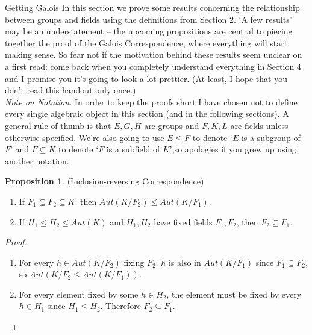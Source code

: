 \documentclass[12pt]{article}
\theoremstyle{definition}
\theoremstyle{definition}
\theoremstyle{definition}
\theoremstyle{definition}
\theoremstyle{definition}
\theoremstyle{definition}
\newtheorem{proposition}{Proposition}[section]
\theoremstyle{definition}
\begin{document}
\newpage

\begin{section}{Getting Galois}
    In this section we prove some results concerning the relationship between groups and fields using the definitions from Section 2. `A few results' may be an understatement -- the upcoming propositions 
    are central to piecing together the proof of the Galois Correspondence, where everything will start making sense. So fear not if the motivation behind these results seem unclear on a first read: 
    come back when you completely understand everything in Section 4 and I promise you it's going to look a lot prettier. (At least, I hope that you don't read this handout only once.)\\

    \textit{Note on Notation.} In order to keep the proofs short I have chosen not to define every single algebraic object in this section (and in the following sections). A general rule of thumb 
    is that \(E,G,H\) are groups and \(F,K,L\) are fields unless otherwise specified. We're also going to use \(E \leq F\) to denote `\(E\) is a subgroup of \(F\)' and \(F\subseteq K\) to denote 
    `\(F\) is a subfield of \(K\)',so apologies if you grew up using another notation.

    \begin{proposition}{(Inclusion-reversing Correspondence)}
        \begin{enumerate}
            \item If \(F_1 \subseteq F_2 \subseteq K\), then \(Aut(K/F_2) \leq Aut(K/F_1)\).
            \item If \(H_1 \leq H_2 \leq Aut(K)\) and \(H_1, H_2\) have fixed fields \(F_1, F_2\), then \(F_2 \subseteq F_1\).
        \end{enumerate}

        \begin{proof}
            \begin{enumerate}
                \item For every \(h\in Aut(K/F_2)\) fixing \(F_2\), \(h\) is also in \(Aut(K/F_1)\) since \(F_1 \subseteq F_2\), so \(Aut(K/F_2 \leq Aut(K/F_1))\).
                \item For every element fixed by some \(h\in H_2\), the element must be fixed by every \(h\in H_1\) since \(H_1 \leq H_2\). Therefore \(F_2 \subseteq F_1\). 
            \end{enumerate}
        \end{proof}
    \end{proposition}


\end{section}
\end{document}
